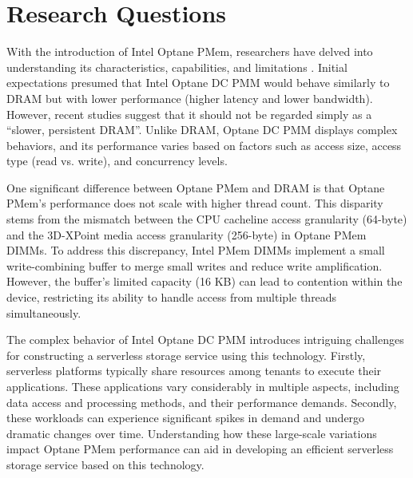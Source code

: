 
\section{Research Questions}

With the introduction of Intel Optane PMem, researchers have delved into understanding its characteristics, capabilities, and limitations \cite{izraelevitz2019basic, yang2020empirical, wu2020ribbon}. Initial expectations presumed that Intel Optane DC PMM would behave similarly to DRAM but with lower performance (higher latency and lower bandwidth). However, recent studies suggest that it should not be regarded simply as a “slower, persistent DRAM”. Unlike DRAM, Optane DC PMM displays complex behaviors, and its performance varies based on factors such as access size, access type (read vs. write), and concurrency levels.

One significant difference between Optane PMem and DRAM is that Optane PMem's performance does not scale with higher thread count. This disparity stems from the mismatch between the CPU cacheline access granularity (64-byte) and the 3D-XPoint media access granularity (256-byte) in Optane PMem DIMMs. To address this discrepancy, Intel PMem DIMMs implement a small write-combining buffer to merge small writes and reduce write amplification. However, the buffer’s limited capacity (16 KB) can lead to contention within the device, restricting its ability to handle access from multiple threads simultaneously.

The complex behavior of Intel Optane DC PMM introduces intriguing challenges for constructing a serverless storage service using this technology. Firstly, serverless platforms typically share resources among tenants to execute their applications. These applications vary considerably in multiple aspects, including data access and processing methods, and their performance demands. Secondly, these workloads can experience significant spikes in demand and undergo dramatic changes over time. Understanding how these large-scale variations impact Optane PMem performance can aid in developing an efficient serverless storage service based on this technology.

